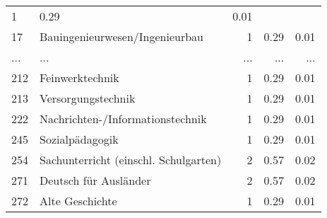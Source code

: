 \begin{longtable}{lXrrr}
          \num{1} &
          \num[round-mode=places,round-precision=2]{0.29} &
          \num[round-mode=places,round-precision=2]{0.01} \\
        17 & \multicolumn{1}{X}{Bauingenieurwesen/Ingenieurbau} & %
          \num{1} &
          \num[round-mode=places,round-precision=2]{0.29} &
          \num[round-mode=places,round-precision=2]{0.01} \\
       ... & ... & ... & ... & ... \\
        212 & \multicolumn{1}{X}{Feinwerktechnik} & %
          \num{1} &
          \num[round-mode=places,round-precision=2]{0.29} &
          \num[round-mode=places,round-precision=2]{0.01} \\

        213 & \multicolumn{1}{X}{Versorgungstechnik} & %
          \num{1} &
          \num[round-mode=places,round-precision=2]{0.29} &
          \num[round-mode=places,round-precision=2]{0.01} \\

        222 & \multicolumn{1}{X}{Nachrichten-/Informationstechnik} & %
          \num{1} &
          \num[round-mode=places,round-precision=2]{0.29} &
          \num[round-mode=places,round-precision=2]{0.01} \\

        245 & \multicolumn{1}{X}{Sozialpädagogik} & %
          \num{1} &
          \num[round-mode=places,round-precision=2]{0.29} &
          \num[round-mode=places,round-precision=2]{0.01} \\

        254 & \multicolumn{1}{X}{Sachunterricht (einschl. Schulgarten)} & %
          \num{2} &
          \num[round-mode=places,round-precision=2]{0.57} &
          \num[round-mode=places,round-precision=2]{0.02} \\

        271 & \multicolumn{1}{X}{Deutsch für Ausländer} & %
          \num{2} &
          \num[round-mode=places,round-precision=2]{0.57} &
          \num[round-mode=places,round-precision=2]{0.02} \\

        272 & \multicolumn{1}{X}{Alte Geschichte} & %
          \num{1} &
          \num[round-mode=places,round-precision=2]{0.29} &
          \num[round-mode=places,round-precision=2]{0.01} \\


\end{longtable}
